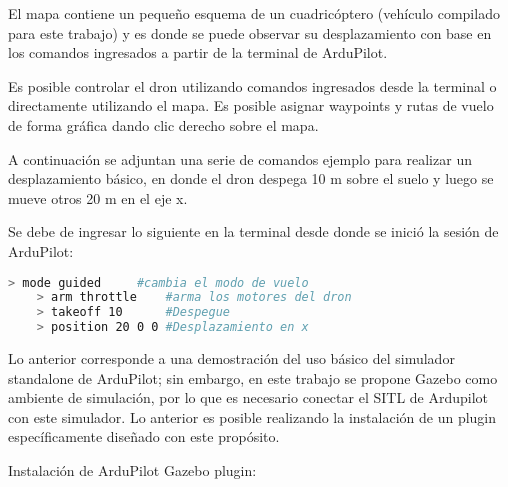 El mapa contiene un pequeño esquema de un cuadricóptero (vehículo compilado para este trabajo) y es donde se puede observar su desplazamiento con base en los comandos ingresados a partir de la terminal de ArduPilot.

Es posible controlar el dron utilizando comandos ingresados desde la terminal o directamente utilizando el mapa. Es posible asignar waypoints y rutas de vuelo de forma gráfica dando clic derecho sobre el mapa.

A continuación se adjuntan una serie de comandos ejemplo para realizar un desplazamiento básico, en donde el dron despega 10 m sobre el suelo y luego se mueve otros 20 m en el eje x.

Se debe de ingresar lo siguiente en la terminal desde donde se inició la sesión de ArduPilot:

\begin{lstlisting}[language = bash]
    > mode guided     #cambia el modo de vuelo
    > arm throttle    #arma los motores del dron
    > takeoff 10      #Despegue
    > position 20 0 0 #Desplazamiento en x
\end{lstlisting}  

Lo anterior corresponde a una demostración del uso básico del simulador standalone de ArduPilot; sin embargo, en este trabajo se propone Gazebo como ambiente de simulación, por lo que es necesario conectar el SITL de Ardupilot con este simulador. Lo anterior es posible realizando la instalación de un plugin específicamente diseñado con este propósito.

Instalación de ArduPilot Gazebo plugin:

